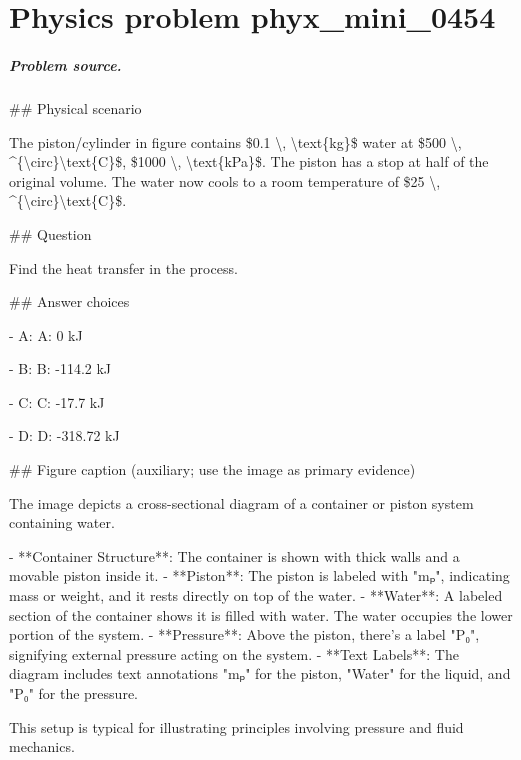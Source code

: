 
\chapter{Physics problem phyx\_mini\_0454}
\label{ch:PhyXMiniProblems_problem_phyx_mini_0454}

\paragraph{Problem source.}
\#\# Physical scenario

The piston/cylinder in figure contains \$0.1 \textbackslash{}, \textbackslash{}text\{kg\}\$ water at \$500 \textbackslash{}, \textasciicircum{}\{\textbackslash{}circ\}\textbackslash{}text\{C\}\$, \$1000 \textbackslash{}, \textbackslash{}text\{kPa\}\$. The piston has a stop at half of the original volume. The water now cools to a room temperature of \$25 \textbackslash{}, \textasciicircum{}\{\textbackslash{}circ\}\textbackslash{}text\{C\}\$.

\#\# Question

Find the heat transfer in the process.

\#\# Answer choices

- A: A: 0 kJ

- B: B: -114.2 kJ

- C: C: -17.7 kJ

- D: D: -318.72 kJ

\#\# Figure caption (auxiliary; use the image as primary evidence)

The image depicts a cross-sectional diagram of a container or piston system containing water. 

- **Container Structure**: The container is shown with thick walls and a movable piston inside it.
- **Piston**: The piston is labeled with "mₚ", indicating mass or weight, and it rests directly on top of the water.
- **Water**: A labeled section of the container shows it is filled with water. The water occupies the lower portion of the system.
- **Pressure**: Above the piston, there's a label "P₀", signifying external pressure acting on the system.
- **Text Labels**: The diagram includes text annotations "mₚ" for the piston, "Water" for the liquid, and "P₀" for the pressure.

This setup is typical for illustrating principles involving pressure and fluid mechanics.

